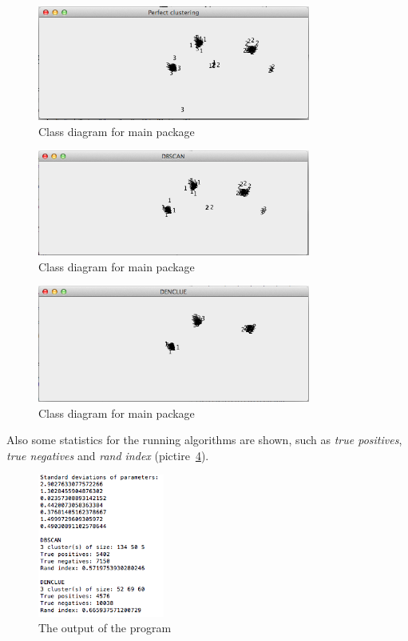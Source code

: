 \documentclass[12pt, a4paper, notitlepage, oneside]{article}
\begin{document}
\begin{figure}[!ht]
 	\centering
	\includegraphics[width=0.8\textwidth]{images/perfect.png}
 	\caption[]
	{Class diagram for main package}
	\label{perfect}
	\end{figure}

\begin{figure}[!ht]
 	\centering
	\includegraphics[width=0.8\textwidth]{images/dbscan.png}
 	\caption[]
	{Class diagram for main package}
	\label{dbscan}
	\end{figure}

\begin{figure}[!ht]
 	\centering
	\includegraphics[width=0.8\textwidth]{images/denclue.png}
 	\caption[]
	{Class diagram for main package}
		\label{denclue}
	\end{figure}

Also some statistics for the running algorithms are shown, such as \textit{true positives}, \textit{true negatives} and \textit{rand index} (pictire~\ref{result}).

\begin{figure}[!ht]
 	\centering
	\includegraphics[width=0.37\textwidth]{images/results.png}
 	\caption[]
	{The output of the program}
		\label{result}
	\end{figure}
\end{document}
